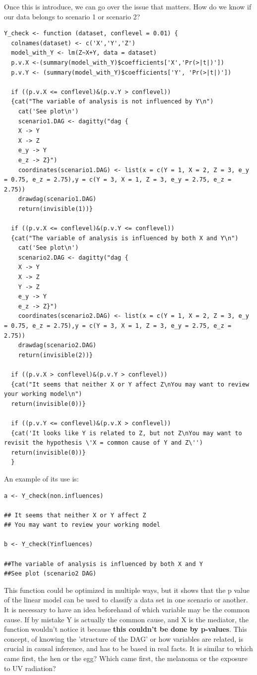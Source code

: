 \documentclass{article}
\begin{document}
Once this is introduce, we can go over the issue that matters. How do we know if our data belongs to scenario 1 or scenario 2? \par

\begin{lstlisting}
Y_check <- function (dataset, conflevel = 0.01) {
  colnames(dataset) <- c('X','Y','Z')
  model_with_Y <- lm(Z~X+Y, data = dataset)
  p.v.X <-(summary(model_with_Y)$coefficients['X','Pr(>|t|)'])
  p.v.Y <- (summary(model_with_Y)$coefficients['Y', 'Pr(>|t|)'])
  
  if ((p.v.X <= conflevel)&(p.v.Y > conflevel))
  {cat("The variable of analysis is not influenced by Y\n")
    cat('See plot\n')
    scenario1.DAG <- dagitty("dag {
    X -> Y
    X -> Z
    e_y -> Y
    e_z -> Z}")
    coordinates(scenario1.DAG) <- list(x = c(Y = 1, X = 2, Z = 3, e_y = 0.75, e_z = 2.75),y = c(Y = 3, X = 1, Z = 3, e_y = 2.75, e_z = 2.75))
    drawdag(scenario1.DAG)
    return(invisible(1))}
  
  if ((p.v.X <= conflevel)&(p.v.Y <= conflevel))
  {cat("The variable of analysis is influenced by both X and Y\n")
    cat('See plot\n')
    scenario2.DAG <- dagitty("dag {
    X -> Y
    X -> Z
    Y -> Z
    e_y -> Y
    e_z -> Z}")
    coordinates(scenario2.DAG) <- list(x = c(Y = 1, X = 2, Z = 3, e_y = 0.75, e_z = 2.75),y = c(Y = 3, X = 1, Z = 3, e_y = 2.75, e_z = 2.75))
    drawdag(scenario2.DAG)
    return(invisible(2))}

  if ((p.v.X > conflevel)&(p.v.Y > conflevel))
  {cat("It seems that neither X or Y affect Z\nYou may want to review your working model\n")
  return(invisible(0))}
  
  if ((p.v.Y <= conflevel)&(p.v.X > conflevel))
  {cat('It looks like Y is related to Z, but not Z\nYou may want to revisit the hypothesis \'X = common cause of Y and Z\'')
  return(invisible(0))}
  }
\end{lstlisting}

An example of its use is:

\begin{lstlisting}
a <- Y_check(non.influences)

## It seems that neither X or Y affect Z
## You may want to review your working model

b <- Y_check(Yinfluences)

##The variable of analysis is influenced by both X and Y
##See plot (scenario2 DAG)
\end{lstlisting}

This function could be optimized in multiple ways, but it shows that the p value of the linear model can be used to classify a data set in one scenario or another. It is necessary to have an idea beforehand of which variable may be the common cause. If by mistake Y is actually the common cause, and X is the mediator, the function wouldn't notice it because \textbf{this couldn't be done by p-values}. This concept, of knowing the 'structure of the DAG' or how variables are related, is crucial in causal inference, and has to be based in real facts. It is similar to which came first, the hen or the egg? Which came first, the melanoma or the exposure to UV radiation?
\end{document}
